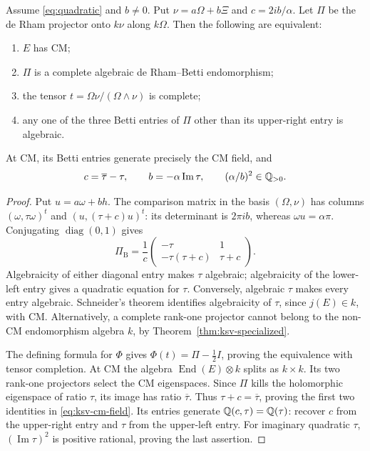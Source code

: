 \begin{proposition}\label{prop:ksv-exact-completion}
Assume \eqref{eq:quadratic} and $b\ne0$.  Put
$\nu=a\Omega+b\Xi$ and $c=2ib/\alpha$.  Let $\Pi$ be the de Rham
projector onto $k\nu$ along $k\Omega$.  Then the following are equivalent:
\begin{enumerate}
\item $E$ has CM;
\item $\Pi$ is a complete algebraic de Rham--Betti endomorphism;
\item the tensor $t=\Omega\nu/(\Omega\wedge\nu)$ is complete;
\item any one of the three Betti entries of $\Pi$ other than its
upper-right entry is algebraic.
\end{enumerate}
At CM, its Betti entries generate precisely the CM field, and
\begin{equation}\label{eq:ksv-cm-field}
 c=\overline\tau-\tau,\qquad
 b=-\alpha\operatorname{Im}\tau,\qquad
 (\alpha/b)^2\in\mathbb Q_{>0}.
\end{equation}
\end{proposition}
\begin{proof}
Put $u=a\omega+bh$.  The comparison matrix in the basis $(\Omega,\nu)$
has columns $(\omega,\tau\omega)^t$ and
$(u,(\tau+c)u)^t$: its determinant is $2\pi ib$, whereas
$\omega u=\alpha\pi$.  Conjugating $\operatorname{diag}(0,1)$ gives
\begin{equation}\label{eq:ksv-projector}
 \Pi_{\mathrm B}=\frac1c
 \begin{pmatrix}-\tau&1\\-\tau(\tau+c)&\tau+c\end{pmatrix}.
\end{equation}
Algebraicity of either diagonal entry makes $\tau$ algebraic;
algebraicity of the lower-left entry gives a quadratic equation for
$\tau$.  Conversely, algebraic $\tau$ makes every entry algebraic.
Schneider's theorem identifies algebraicity of $\tau$, since
$j(E)\in k$, with CM.  Alternatively, a complete rank-one projector
cannot belong to the non-CM endomorphism algebra $k$, by
Theorem~\ref{thm:ksv-specialized}.

The defining formula for $\Phi$ gives
$\Phi(t)=\Pi-\tfrac12I$, proving the equivalence with tensor completion.
At CM the algebra $\operatorname{End}(E)\otimes k$ splits as
$k\times k$.  Its two rank-one projectors select the CM eigenspaces.
Since $\Pi$ kills the holomorphic eigenspace of ratio $\tau$, its image
has ratio $\overline\tau$.  Thus $\tau+c=\overline\tau$, proving the
first two identities in \eqref{eq:ksv-cm-field}.  Its entries generate
$\mathbb Q(c,\tau)=\mathbb Q(\tau)$: recover $c$ from the upper-right entry and
$\tau$ from the upper-left entry.  For imaginary quadratic $\tau$,
$(\operatorname{Im}\tau)^2$ is positive rational, proving the last
assertion.
\end{proof}

